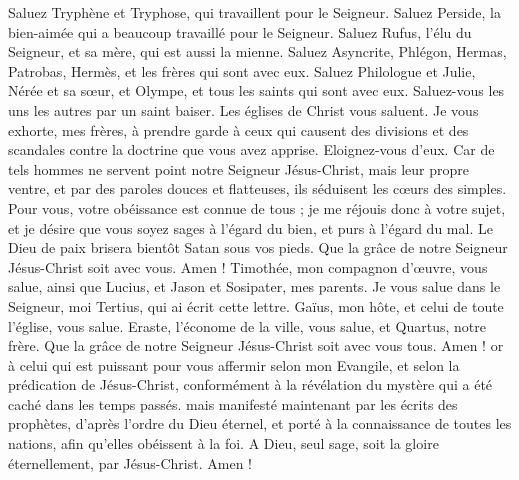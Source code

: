 \begin{multicols}{2}
Saluez Tryphène et Tryphose, qui travaillent pour le Seigneur. Saluez Perside, la bien-aimée qui a beaucoup travaillé pour le Seigneur.
Saluez Rufus, l’élu du Seigneur, et sa mère, qui est aussi la mienne.
Saluez Asyncrite, Phlégon, Hermas, Patrobas, Hermès, et les frères qui sont avec eux.
Saluez Philologue et Julie, Nérée et sa sœur, et Olympe, et tous les saints qui sont avec eux.
Saluez-vous les uns les autres par un saint baiser. Les églises de Christ vous saluent.
Je vous exhorte, mes frères, à prendre garde à ceux qui causent des divisions et des scandales contre la doctrine que vous avez apprise. Eloignez-vous d'eux.
Car de tels hommes ne servent point notre Seigneur Jésus-Christ, mais leur propre ventre, et par des paroles douces et flatteuses, ils séduisent les cœurs des simples.
Pour vous, votre obéissance est connue de tous ; je me réjouis donc à votre sujet, et je désire que vous soyez sages à l’égard du bien, et purs à l’égard du mal.
Le Dieu de paix brisera bientôt Satan sous vos pieds. Que la grâce de notre Seigneur Jésus-Christ soit avec vous. Amen !
Timothée, mon compagnon d’œuvre, vous salue, ainsi que Lucius, et Jason et Sosipater, mes parents.
Je vous salue dans le Seigneur, moi Tertius, qui ai écrit cette lettre.
Gaïus, mon hôte, et celui de toute l'église, vous salue. Eraste, l’économe de la ville, vous salue, et Quartus, notre frère.
\TextTitle{[Bénédiction]}
Que la grâce de notre Seigneur Jésus-Christ soit avec vous tous. Amen !
or à celui qui est puissant pour vous affermir selon mon Evangile, et selon la prédication de Jésus-Christ, conformément à la révélation du mystère qui a été caché dans les temps passés.
mais manifesté maintenant par les écrits des prophètes, d’après l’ordre du Dieu éternel, et porté à la connaissance de toutes les nations, afin qu’elles obéissent à la foi.
A Dieu, seul sage, soit la gloire éternellement, par Jésus-Christ. Amen !
\PPE{}
\end{multicols}
